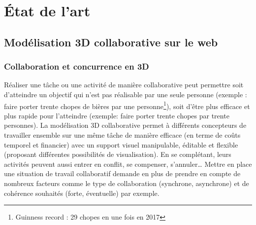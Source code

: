 \chapter{État de l'art}
\chaptertable


\section{Modélisation 3D collaborative sur le web}

\subsection{Collaboration et concurrence en 3D}
\label{sec:concurrence}
Réaliser une tâche ou une activité de manière collaborative peut permettre soit d'atteindre 
un objectif qui n'est pas réalisable par une seule personne (exemple : faire porter trente 
chopes de bières par une personne\footnote{Guinness record : 29 chopes en une fois en 2017}), soit 
d'être plus efficace et plus rapide pour l'atteindre (exemple: faire porter trente chopes par trente personnes). 
La modélisation \gls{3D} collaborative permet à différents concepteurs de travailler 
ensemble sur une même tâche de manière efficace (en terme de coûts temporel et 
financier) avec un support visuel manipulable, éditable et flexible (proposant 
différentes possibilités de visualisation). 
En se complétant, leurs activités peuvent aussi entrer en conflit, se compenser, 
s'annuler\ldots
Mettre en place une situation de travail collaboratif demande en plus de prendre en compte de nombreux facteurs 
comme le type de collaboration (synchrone, asynchrone) et de cohérence souhaités 
(forte, éventuelle) par exemple.

